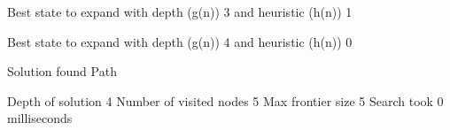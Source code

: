 \documentclass{article}
\begin{document}
{\noindent Best state to expand with depth (g(n)) 3 and heuristic (h(n)) 1\newline}
{}\newline

{\noindent Best state to expand with depth (g(n)) 4 and heuristic (h(n)) 0\newline}
{}\newline

{\noindent Solution found\newline}
Path\newline
{}\newline

{}\newline

{}\newline

{}\newline

{}\newline

{\noindent Depth of solution 4\newline}
Number of visited nodes 5\newline
Max frontier size 5\newline
Search took 0 milliseconds\newline
\end{document}
